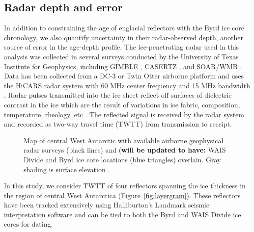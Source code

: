 \subsection{Radar depth and error}
In addition to constraining the age of englacial reflectors with the Byrd ice core chronology, we also quantify uncertainty in their radar-observed depth, another source of error in the age-depth profile. The ice-penetrating radar used in this analysis was collected in several surveys conducted by the University of Texas Institute for Geophysics, including GIMBLE \citep{young2012}, CASERTZ \citep{morse2002}, and SOAR/WMB \citep{luyendyk2003}. Data has been collected from a DC-3 or Twin Otter airborne platform and uses the HiCARS radar system with 60 MHz center frequency and 15 MHz bandwidth \citep{peters2005}. Radar pulses transmitted into the ice sheet reflect off surfaces of dielectric contrast in the ice which are the result of variations in ice fabric, composition, temperature, rheology, etc \citep{fujita2000}. The reflected signal is received by the radar system and recorded as two-way travel time (TWTT) from transmission to receipt. 


\begin{figure}[h]\label{fig:radarmap}
\centering
{}
\caption{Map of central West Antarctic with available airborne geophysical radar surveys (black lines) and (\textbf{will be updated to have:} WAIS Divide and Byrd ice core locations (blue triangles) overlain. Gray shading is surface elevation \citep{fretwell2013}. }

\end{figure}



In this study, we consider TWTT of four reflectors spanning the ice thickness in the region of central West Antarctica (Figure~\ref{fig:layergram}). These reflectors have been tracked extensively using Halliburton's Landmark seismic interpretation software and can be tied to both the Byrd and WAIS Divide ice cores for dating. %

